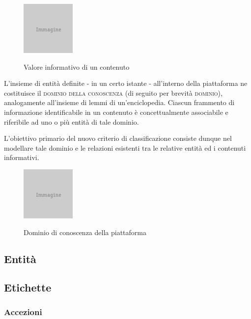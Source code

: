 \documentclass[11pt,a4paper,headsepline,hidelinks]{scrreprt} %
\begin{document}
	\begin{figure}[ht]
     \begin{center}
       \includegraphics{placeholder.png}
       \label{fig:tesi:stage:fase-uno:contenuti-informativi}
       \caption{Valore informativo di un contenuto}
     \end{center}
   \end{figure}
  
  L'insieme di entità definite - in un certo istante - all'interno della piattaforma ne costituisce il \textsc{dominio della conoscenza} (di seguito per brevità \textsc{dominio}), analogamente all'insieme di lemmi di un'enciclopedia. Ciascun frammento di informazione identificabile in un contenuto è concettualmente associabile e riferibile ad uno o più entità di tale dominio.
  
  L'obiettivo primario del nuovo criterio di classificazione consiste dunque nel modellare tale dominio e le relazioni esistenti tra le relative entità ed i contenuti informativi. 

	\begin{figure}[ht]
     \begin{center}
       \includegraphics{placeholder.png}
       \label{fig:tesi:stage:fase-uno:dominio-conoscenza}
       \caption{Dominio di conoscenza della piattaforma}
     \end{center}
   \end{figure}
   
  \subsection{Entità}
  
  \subsection{Etichette}
  
  \subsubsection{Accezioni}
\end{document}
